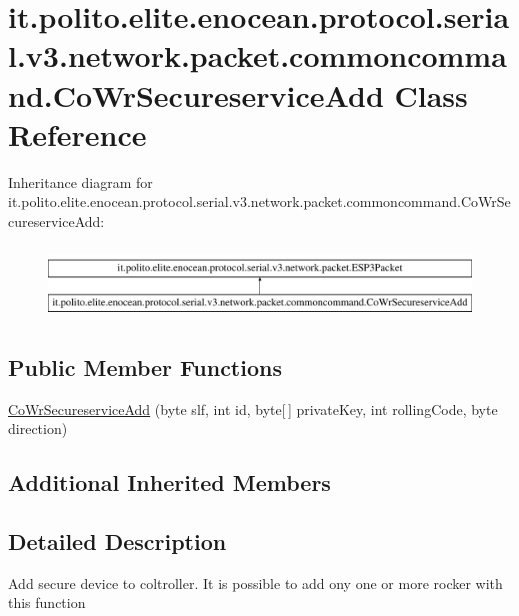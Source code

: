 \hypertarget{classit_1_1polito_1_1elite_1_1enocean_1_1protocol_1_1serial_1_1v3_1_1network_1_1packet_1_1commonca997d3afe0dd586e9c8ea3e0d17ef84}{}\section{it.\+polito.\+elite.\+enocean.\+protocol.\+serial.\+v3.\+network.\+packet.\+commoncommand.\+Co\+Wr\+Secureservice\+Add Class Reference}
\label{classit_1_1polito_1_1elite_1_1enocean_1_1protocol_1_1serial_1_1v3_1_1network_1_1packet_1_1commonca997d3afe0dd586e9c8ea3e0d17ef84}
Inheritance diagram for it.\+polito.\+elite.\+enocean.\+protocol.\+serial.\+v3.\+network.\+packet.\+commoncommand.\+Co\+Wr\+Secureservice\+Add\+:\begin{figure}[H]
\begin{center}
\leavevmode
\includegraphics[height=1.941074cm]{classit_1_1polito_1_1elite_1_1enocean_1_1protocol_1_1serial_1_1v3_1_1network_1_1packet_1_1commonca997d3afe0dd586e9c8ea3e0d17ef84}
\end{center}
\end{figure}
\subsection*{Public Member Functions}
\begin{DoxyCompactItemize}
\item 
\hyperlink{classit_1_1polito_1_1elite_1_1enocean_1_1protocol_1_1serial_1_1v3_1_1network_1_1packet_1_1commonca997d3afe0dd586e9c8ea3e0d17ef84_ae65e8af1b5cc6598b9e71a4d651b17bc}{Co\+Wr\+Secureservice\+Add} (byte slf, int id, byte\mbox{[}$\,$\mbox{]} private\+Key, int rolling\+Code, byte direction)
\end{DoxyCompactItemize}
\subsection*{Additional Inherited Members}


\subsection{Detailed Description}
Add secure device to coltroller. It is possible to add ony one or more rocker with this function

